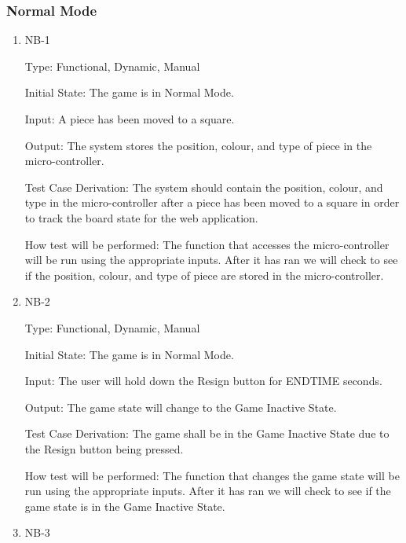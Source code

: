 \documentclass[12pt, titlepage]{article}
\begin{document}
    \subsubsection{Normal Mode}
  
    \begin{enumerate}
  
      \item{NB-1\\}
  
      Type: Functional, Dynamic, Manual
                          
      Initial State: The game is in Normal Mode.
                          
      Input: A piece has been moved to a square.
                          
      Output: The system stores the position, colour, and type of piece in the micro-controller.
                          
      Test Case Derivation: The system should contain the position, colour, and type in the micro-controller
      after a piece has been moved to a square in order to track the board state for the web application.
  
      How test will be performed: The function that accesses the micro-controller will be run using the appropriate inputs.
      After it has ran we will check to see if the position, colour, and type of piece are stored in the micro-controller.  
  
      \item{NB-2\\}
  
      Type: Functional, Dynamic, Manual
                        
      Initial State: The game is in Normal Mode.
                          
      Input: The user will hold down the Resign button for ENDTIME seconds.
                          
      Output: The game state will change to the Game Inactive State.
                          
      Test Case Derivation: The game shall be in the Game Inactive State due to the Resign button being pressed.
      
      How test will be performed: The function that changes the game state will be run using the appropriate inputs.
      After it has ran we will check to see if the game state is in the Game Inactive State.
  
      \item{NB-3\\}
  

\end{enumerate}
\end{document}
